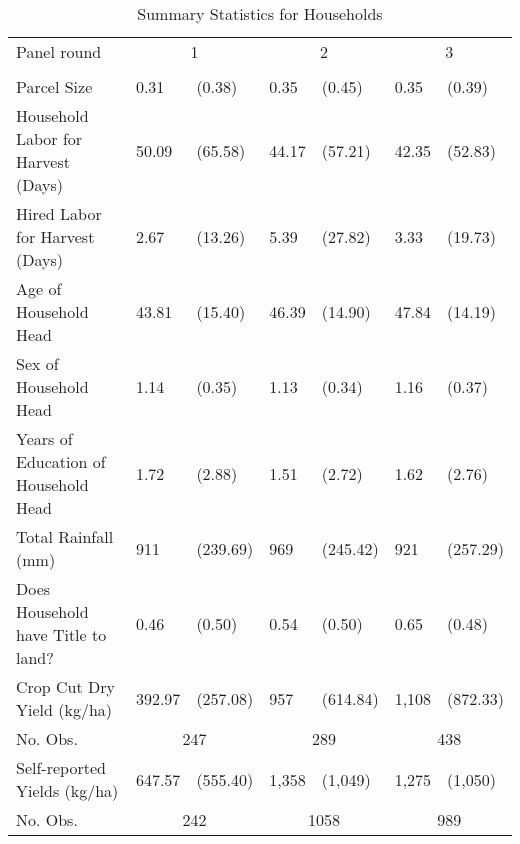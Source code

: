 \begin{table}
\centering
\caption{Summary Statistics for Households}
\label{tbl:summary}
\begin{tabular}{lllllll}
\toprule
 Panel round & \multicolumn{2}{c}{1} & \multicolumn{2}{c}{2} & \multicolumn{2}{c}{3} \\
 &  &  &  &  &  &  \\
\midrule
Parcel Size & 0.31 & (0.38) & 0.35 & (0.45) & 0.35 & (0.39) \\
Household Labor for Harvest (Days) & 50.09 & (65.58) & 44.17 & (57.21) & 42.35 & (52.83) \\
Hired Labor for Harvest (Days) & 2.67 & (13.26) & 5.39 & (27.82) & 3.33 & (19.73) \\
Age of Household Head & 43.81 & (15.40) & 46.39 & (14.90) & 47.84 & (14.19) \\
Sex of Household Head & 1.14 & (0.35) & 1.13 & (0.34) & 1.16 & (0.37) \\
Years of Education of Household Head & 1.72 & (2.88) & 1.51 & (2.72) & 1.62 & (2.76) \\
Total Rainfall (mm) & 911 & (239.69) & 969 & (245.42) & 921 & (257.29) \\
Does Household have Title to land? & 0.46 & (0.50) & 0.54 & (0.50) & 0.65 & (0.48) \\
Crop Cut Dry Yield (kg/ha) & 392.97 & (257.08) & 957 & (614.84) & 1,108 & (872.33) \\
No. Obs. & \multicolumn{2}{c}{247}&\multicolumn{2}{c}{289}&\multicolumn{2}{c}{438}\\
\midrule
Self-reported Yields (kg/ha) & 647.57 & (555.40) & 1,358 & (1,049) & 1,275 & (1,050) \\
No. Obs.  & \multicolumn{2}{c}{242}&\multicolumn{2}{c}{1058}&\multicolumn{2}{c}{989}\\
\bottomrule
\end{tabular}
\end{table}
